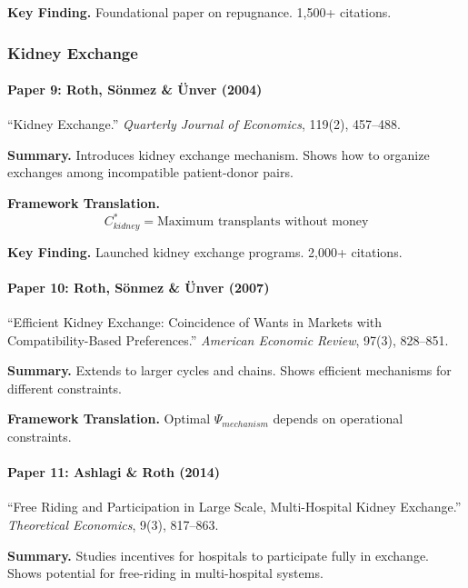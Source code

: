 \textbf{Key Finding.}
Foundational paper on repugnance. 1,500+ citations.

\subsubsection{Kidney Exchange}

\paragraph{Paper 9: Roth, Sönmez \& Ünver (2004)}

``Kidney Exchange.''
\textit{Quarterly Journal of Economics}, 119(2), 457--488.

\textbf{Summary.}
Introduces kidney exchange mechanism. Shows how to organize exchanges 
among incompatible patient-donor pairs.

\textbf{Framework Translation.}
\begin{equation}
C^*_{kidney} = \text{Maximum transplants without money}
\end{equation}

\textbf{Key Finding.}
Launched kidney exchange programs. 2,000+ citations.

\paragraph{Paper 10: Roth, Sönmez \& Ünver (2007)}

``Efficient Kidney Exchange: Coincidence of Wants in Markets with 
Compatibility-Based Preferences.''
\textit{American Economic Review}, 97(3), 828--851.

\textbf{Summary.}
Extends to larger cycles and chains. Shows efficient mechanisms for 
different constraints.

\textbf{Framework Translation.}
Optimal $\Psi_{mechanism}$ depends on operational constraints.

\paragraph{Paper 11: Ashlagi \& Roth (2014)}

``Free Riding and Participation in Large Scale, Multi-Hospital Kidney Exchange.''
\textit{Theoretical Economics}, 9(3), 817--863.

\textbf{Summary.}
Studies incentives for hospitals to participate fully in exchange.
Shows potential for free-riding in multi-hospital systems.

